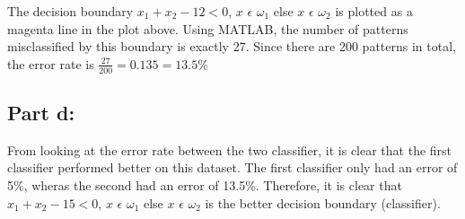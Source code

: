 \documentclass[a4paper,12pt]{article}
\begin{document}
The decision boundary $x_1 + x_2 - 12 < 0$, $x$ $\epsilon$ $\omega_1$ else $x$ $\epsilon$ $\omega_2$ is plotted as a magenta line in the plot above. Using MATLAB, the number of patterns misclassified by this boundary is exactly 27. Since there are 200 patterns in total, the error rate is $\frac{27}{200} = 0.135 = 13.5 \%$

\subsection*{Part d:}
From looking at the error rate between the two classifier, it is clear that the first classifier performed better on this dataset.  The first classifier only had an error of 5\%, wheras the second had an error of 13.5\%. Therefore, it is clear that $x_1 + x_2 - 15 < 0$, $x$ $\epsilon$ $\omega_1$ else $x$ $\epsilon$ $\omega_2$ is the better decision boundary (classifier).
\pagebreak
\end{document}
